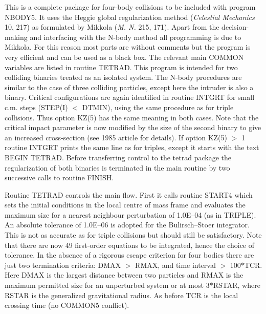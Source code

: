  This is a complete package for four-body collisions to be included with program NBODY5.  It uses                
   the Heggie global regularization method ({\it Celestial Mechanics} 10, 217) as formulated                  
by Mikkola ({\it M. N.}
   215, 171).  Apart from the decision-making and interfacing with the N-body method all programming is                 
   due to Mikkola.  For this reason most parts are without comments but the program is very                     
   efficient and can be used as a black box.  The relevant main COMMON
   variables are listed in routine TETRAD.  This program is intended for two colliding binaries                       
   treated as an isolated system.  The N-body procedures are similar to the case of three colliding                     
   particles, except here the intruder is also a binary.  Critical configurations are again identified                  
   in routine INTGRT for small c.m. steps (STEP(I) $<$ DTMIN), using the same procedure as for triple                     
   collisions.  Thus option KZ(5) has the same meaning in both cases.  Note that the critical impact                    
   parameter is now modified by the size of the second binary to give an                    
   increased cross-section (see 1985 article for details).  If
   option KZ(5) $>$ 1 routine INTGRT prints the same line as for triples, except it starts with the text                  
   BEGIN TETRAD.  Before transferring control to the tetrad package the regularization of both binaries                 
  is terminated in the main routine by two successive calls to routine FINISH.                                                    

 Routine TETRAD controls the main flow.  First it calls routine START4 which sets the initial                    
   conditions in the local centre of mass frame and evaluates the maximum size for a nearest neighbour                  
   perturbation of 1.0E--04 (as in TRIPLE).  An absolute tolerance of 1.0E--06 is adopted                          
   for the Bulirsch--Stoer
   integrator.  This is not as accurate as for triple collisions but should still be satisfactory.  Note                
   that there are now 49 first-order equations to be integrated, hence the choice of tolerance.  In the                 
   absence of a rigorous escape criterion for four bodies there are just two termination criteria:  DMAX                
   $>$ RMAX, and time interval $>$ 100$\ast$TCR.  Here DMAX is the largest                 
   distance between two particles and RMAX
   is the maximum permitted size for an unperturbed system or at most 3$\ast$RSTAR, where RSTAR is the                       
   generalized gravitational radius.  As before TCR is the local                                          
  crossing time (no COMMON5 conflict).

